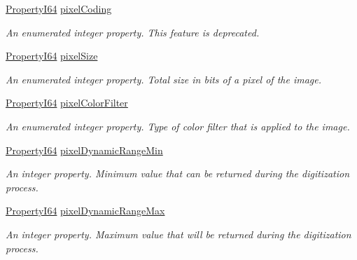 \begin{DoxyCompactItemize}
\hyperlink{group___common_interface_ga81749b2696755513663492664a18a893}{Property\+I64} \hyperlink{classmv_i_m_p_a_c_t_1_1acquire_1_1_gen_i_cam_1_1_image_format_control_a9eac6c5f816b0325c6d82d6007b44c33}{pixel\+Coding}
\begin{DoxyCompactList}\small\item\em An enumerated integer property. This feature is deprecated. \end{DoxyCompactList}\item 
\hyperlink{group___common_interface_ga81749b2696755513663492664a18a893}{Property\+I64} \hyperlink{classmv_i_m_p_a_c_t_1_1acquire_1_1_gen_i_cam_1_1_image_format_control_ae53cd02f210eb37fea2b598a5918b92b}{pixel\+Size}
\begin{DoxyCompactList}\small\item\em An enumerated integer property. Total size in bits of a pixel of the image. \end{DoxyCompactList}\item 
\hyperlink{group___common_interface_ga81749b2696755513663492664a18a893}{Property\+I64} \hyperlink{classmv_i_m_p_a_c_t_1_1acquire_1_1_gen_i_cam_1_1_image_format_control_a4c2b95c8ec6a3310fe5203ad1146fa41}{pixel\+Color\+Filter}
\begin{DoxyCompactList}\small\item\em An enumerated integer property. Type of color filter that is applied to the image. \end{DoxyCompactList}\item 
\hyperlink{group___common_interface_ga81749b2696755513663492664a18a893}{Property\+I64} \hyperlink{classmv_i_m_p_a_c_t_1_1acquire_1_1_gen_i_cam_1_1_image_format_control_a434df34fdcccc6adeb2c2b1ebc9ccc82}{pixel\+Dynamic\+Range\+Min}
\begin{DoxyCompactList}\small\item\em An integer property. Minimum value that can be returned during the digitization process. \end{DoxyCompactList}\item 
\hyperlink{group___common_interface_ga81749b2696755513663492664a18a893}{Property\+I64} \hyperlink{classmv_i_m_p_a_c_t_1_1acquire_1_1_gen_i_cam_1_1_image_format_control_a3ea6f4380cf3602ce729c53f83ec078c}{pixel\+Dynamic\+Range\+Max}
\begin{DoxyCompactList}\small\item\em An integer property. Maximum value that will be returned during the digitization process. \end{DoxyCompactList}\item 

\end{DoxyCompactItemize}
